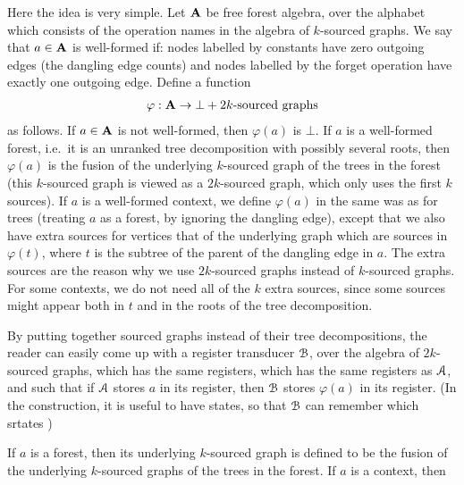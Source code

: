 Here the idea is very simple. Let $\mathbf{A}$ be free forest algebra, over the alphabet which consists of the operation names in the algebra of $k$-sourced graphs. We say that $a \in \mathbf{A}$ is well-formed if: nodes labelled by constants have zero outgoing edges (the dangling edge counts) and nodes labelled by the forget operation have exactly one outgoing edge. Define a function
\begin{align*}
    \varphi : \mathbf{A} \to \bot + \text{$2k$-sourced graphs}
\end{align*}
as follows. If $a \in \mathbf{A}$ is not well-formed, then $\varphi(a)$ is $\bot$. If $a$ is a well-formed forest, i.e.~it is an unranked tree decomposition with possibly several roots, then $\varphi(a)$ is the fusion of the  underlying $k$-sourced graph of the trees in the forest (this $k$-sourced graph is viewed as a $2k$-sourced graph, which only uses the first $k$ sources). If $a$ is a well-formed context, we define $\varphi(a)$ in the same was as for trees (treating $a$ as a forest, by ignoring the dangling edge), except that we also have  extra sources for vertices that of the underlying graph which are sources in $\varphi(t)$, where $t$ is the subtree of the parent of the dangling edge in $a$. The extra sources are the reason why we use $2k$-sourced graphs instead of $k$-sourced graphs. For some contexts, we do not need all of the $k$ extra sources, since some sources might appear both in $t$ and in the roots of the tree decomposition.

By putting together sourced graphs instead of their tree decompositions, the reader can easily come up with a register transducer ${\mathcal B}$, over the algebra of $2k$-sourced graphs, which has the same registers, which has the same registers as ${\mathcal A}$, and such that if ${\mathcal A}$ stores $a$ in its register, then ${\mathcal B}$ stores $\varphi(a)$ in its register. (In the construction, it is useful to have states, so that ${\mathcal B}$ can remember which srtates )

If $a$ is a forest, then its underlying $k$-sourced graph is defined to be the fusion of the underlying $k$-sourced graphs of the trees in the forest. If $a$ is a context, then 